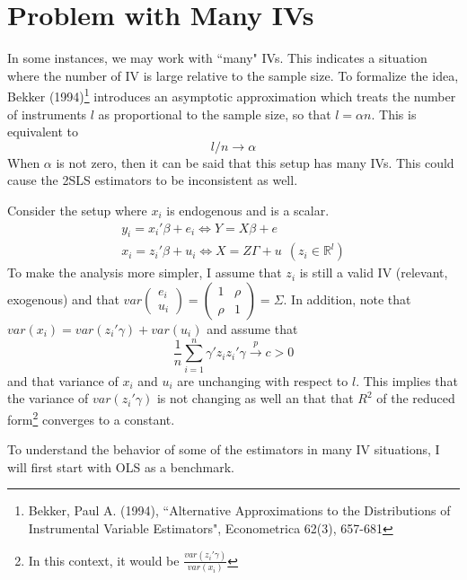 \section{Problem with Many IVs}
In some instances, we may work with ``many" IVs. This indicates a situation where the number of IV is large relative to the sample size. To formalize the idea, Bekker (1994)\footnote{Bekker, Paul A. (1994),  ``Alternative Approximations to the Distributions of Instrumental Variable Estimators", Econometrica 62(3), 657-681} introduces an asymptotic approximation which treats the number of instruments $l$ as proportional to the sample size, so that $l=\alpha n$. This is equivalent to 
\[
l/n \to \alpha 
\]
When $\alpha$ is not zero, then it can be said that this setup has many IVs. This could cause the 2SLS estimators to be inconsistent as well. \par
Consider the setup where $x_i$ is endogenous and is a scalar. 
\begin{gather*}
y_ i = x_i'\beta+e_i \iff Y=X\beta+e \\
x_i = z_i'\beta+u_i \iff X=Z\Gamma+u \ \ (z_i \in \mathbb{R}^l)
\end{gather*}
To make the analysis more simpler, I assume that $z_i$ is still a valid IV (relevant, exogenous) and that $var\begin{pmatrix} e_i \\ u_i \end{pmatrix} = \begin{pmatrix}1 & \rho \\ \rho & 1 \end{pmatrix} = \Sigma$. In addition, note that $var(x_i) = var(z_i'\gamma)+var(u_i)$ and assume that
\[
\frac{1}{n}\sum_{i=1}^n \gamma'z_iz_i'\gamma\xrightarrow{p}c>0
\]
and that variance of $x_i$ and $u_i$ are unchanging with respect to $l$. This implies that the variance of $var(z_i'\gamma)$ is not changing as well an that that $R^2$ of the reduced form\footnote{In this context, it would be $\frac{var(z_i'\gamma)}{var(x_i)}$}  converges to a constant. \par
To understand the behavior of some of the estimators in many IV situations, I will first start with OLS as a benchmark.

